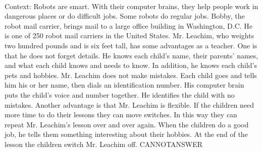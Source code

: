 \documentclass[11pt,a4paper, onecolumn]{article}
\begin{document}
\\ Context: Robots are smart. With their computer brains, they help people work in dangerous places or do difficult jobs. Some robots do regular jobs. Bobby, the robot mail carrier, brings mail to a large office building in Washington, D.C. He is one of 250 robot mail carriers in the United States. Mr. Leachim, who weights two hundred pounds and is six feet tall, has some advantages as a teacher. One is that he does not forget details. He knows each child's name, their parents' names, and what each child knows and needs to know. In addition, he knows each child's pets and hobbies. Mr. Leachim does not make mistakes. Each child goes and tells him his or her name, then dials an identification number. His computer brain puts the child's voice and number together. He identifies the child with no mistakes. Another advantage is that Mr. Leachim is flexible. If the children need more time to do their lessons they can move switches. In this way they can repeat Mr. Leachim's lesson over and over again. When the children do a good job, he tells them something interesting about their hobbies. At the end of the lesson the children switch Mr. Leachim off. CANNOTANSWER
\end{document}
